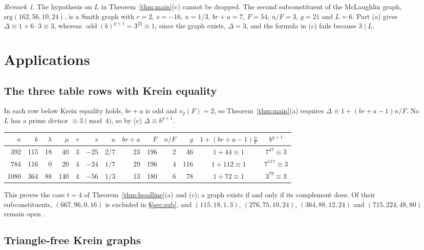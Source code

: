 \documentclass[11pt]{article}
\theoremstyle{definition}
\theoremstyle{remark}
\newtheorem{remark}[theorem]{Remark}
\newcommand{\odd}{\operatorname{odd}}
\begin{document}
\begin{remark}\label{rem:sharp}
The hypothesis on $L$ in Theorem~\ref{thm:main}(c) cannot be dropped. The
second subconstituent of the McLaughlin graph, $\mathrm{srg}(162,56,10,24)$, is
a Smith graph with $r=2$, $s=-16$, $u=1/3$, $br+a=7$, $F=54$, $n/F=3$, $g=21$
and $L=6$. Part (a) gives $\Delta\equiv1+6\cdot3\equiv3$, whereas
$\odd(b)^{g+1}=3^{22}\equiv1$; since the graph exists, $\Delta=3$, and the
formula in (c) fails because $3\mid L$.
\end{remark}

\section{Applications}\label{sec:apps}

\subsection{The three table rows with Krein equality}
In each row below Krein equality holds, $br+a$ is odd and $v_2(F)=2$, so
Theorem~\ref{thm:main}(a) requires $\Delta\equiv1+(br+a-1)n/F$. No $L$ has a
prime divisor $\equiv3\pmod4$, so by (c) $\Delta\equiv b^{g+1}$.
\begin{center}\setlength{\tabcolsep}{4pt}
\begin{tabular}{rrrrrrrrrrrcc}\toprule
$n$&$k$&$\lambda$&$\mu$&$r$&$s$&$u$&$br+a$&$F$&$n/F$&$g$&$1+(br+a-1)\frac nF$&$b^{g+1}$\\
\midrule
392&115&18&40&3&$-25$&$2/7$&23&196&2&46&$1+44\equiv1$&$7^{47}\equiv3$\\
784&116&0&20&4&$-24$&$1/7$&29&196&4&116&$1+112\equiv1$&$7^{117}\equiv3$\\
1080&364&88&140&4&$-56$&$1/3$&13&180&6&78&$1+72\equiv1$&$3^{79}\equiv3$\\
\bottomrule
\end{tabular}
\end{center}
This proves the case $t=4$ of Theorem~\ref{thm:headline}(a) and (c); a graph
exists if and only if its complement does. Of their subconstituents,
$(667,96,0,16)$ is excluded in \S\ref{sec:sub}, and $(115,18,1,3)$,
$(276,75,10,24)$, $(364,88,12,24)$ and $(715,224,48,80)$ remain open
\cite{Tab}.

\subsection{Triangle-free Krein graphs}
\end{document}
